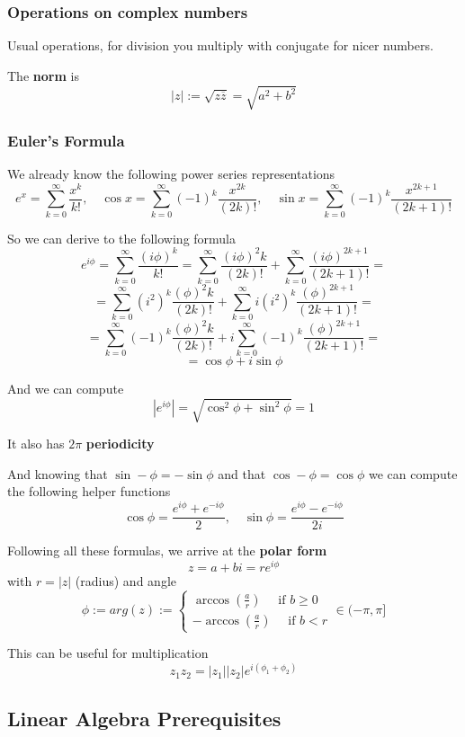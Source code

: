 \documentclass{article}
\begin{document}
\subsubsection{Operations on complex numbers}
Usual operations, for division you multiply with conjugate for nicer numbers.

The \textbf{norm} is
\[|z| := \sqrt{z\overline{z}} = \sqrt{a^2 + b^2}\]

\subsubsection{Euler's Formula}
We already know the following power series representations
\[e^x = \sum_{k=0}^{\infty}\frac{x^k}{k!}, \quad \cos x = \sum_{k=0}^{\infty}(-1)^k\frac{x^{2k}}{(2k)!}, \quad \sin x = \sum_{k=0}^{\infty}(-1)^k \frac{x^{2k+1}}{(2k+1)!}\]

So we can derive to the following formula
\[e^{i\phi} = \sum_{k=0}^{\infty}\frac{(i\phi)^k}{k!} = \sum_{k=0}^{\infty}\frac{(i\phi)^2k}{(2k)!} + \sum_{k=0}^{\infty}\frac{(i\phi)^{2k+1}}{(2k+1)!}=\]
\[=\sum_{k=0}^{\infty}(i^2)^k\frac{(\phi)^2k}{(2k)!} + \sum_{k=0}^{\infty}i(i^2)^k\frac{(\phi)^{2k+1}}{(2k+1)!}=\]
\[=\sum_{k=0}^{\infty}(-1)^k\frac{(\phi)^2k}{(2k)!} + i\sum_{k=0}^{\infty}(-1)^k\frac{(\phi)^{2k+1}}{(2k+1)!}=\]
\[= \cos \phi + i\sin \phi\]

And we can compute
\[|e^{i\phi}| = \sqrt{\cos^2 \phi + \sin^2\phi} = 1\]

It also has $2\pi$ \textbf{periodicity}

And knowing that $\sin-\phi = -\sin\phi$ and that $\cos-\phi = \cos\phi$ we can compute the following helper functions
\[\cos\phi = \frac{e^{i\phi} + e^{-i\phi}}{2} ,\quad \sin\phi = \frac{e^{i\phi} - e^{-i\phi}}{2i}\]

Following all these formulas, we arrive at the \textbf{polar form}
\[z = a+bi = re^{i\phi}\]
with $r = |z|$ (radius) and angle
\[\phi := arg(z) := \begin{cases}
  \arccos (\frac{a}{r}) \quad \text{ if } b \geq 0\\
  -\arccos (\frac{a}{r}) \quad \text{ if } b < r
\end{cases} \in (-\pi,\pi]\]

This can be useful for multiplication
\[z_1z_2 = |z_1||z_2|e^{i(\phi_1 + \phi_2)}\]


\subsection{Linear Algebra Prerequisites}
\end{document}
